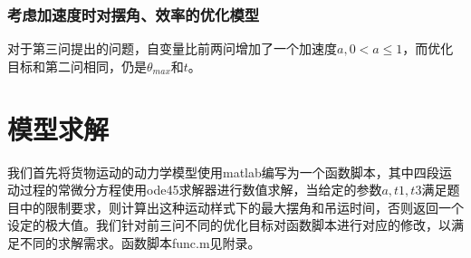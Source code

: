 \documentclass[withoutpreface,bwprint]{cumcmthesis} %
\begin{document}
\subsubsection{考虑加速度时对摆角、效率的优化模型}
对于第三问提出的问题，自变量比前两问增加了一个加速度$a, 0<a\leq1$，而优化目标和第二问相同，仍是$\theta_{max}$和$t$。

\section{模型求解}
我们首先将货物运动的动力学模型使用matlab编写为一个函数脚本，其中四段运动过程的常微分方程使用ode45求解器进行数值求解，当给定的参数$a,t1,t3$满足题目中的限制要求，则计算出这种运动样式下的最大摆角和吊运时间，否则返回一个设定的极大值。我们针对前三问不同的优化目标对函数脚本进行对应的修改，以满足不同的求解需求。函数脚本func.m见附录。
\end{document}
